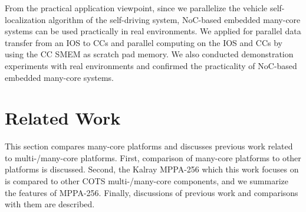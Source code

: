 From the practical application viewpoint, since we parallelize the vehicle self-localization algorithm of the self-driving system, NoC-based embedded many-core systems can be used practically in real environments.
We applied for parallel data transfer from an IOS to CCs and parallel computing on the IOS and CCs by using the CC SMEM as scratch pad memory.    
We also conducted demonstration experiments with real environments and confirmed the practicality of NoC-based embedded many-core systems.

\chapter{Related Work}
\label{sec:related_work}
This section compares many-core platforms and discusses previous work related to multi-/many-core platforms.
First, comparison of many-core platforms to other platforms is discussed.
Second, the Kalray MPPA-256 which this work focuses on is compared to other COTS multi-/many-core components, and we summarize the features of MPPA-256.
Finally, discussions of previous work and comparisons with them are described.


